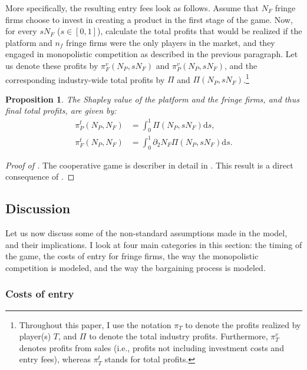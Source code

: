 \documentclass[a4paper]{article}
\newtheorem{proposition}{Proposition}
\newcommand{\ds}{\mathrm{d}s}
\begin{document}
More specifically, the resulting entry fees look as follows.
Assume that $N_F$ fringe firms choose to invest in creating a product in the first stage of the game.
Now, for every $s N_F$ ($s \in [0, 1]$), calculate the total profits that would be realized if the platform and $n_f$ fringe firms were the only players in the market, and they engaged in monopolistic competition as described in the previous paragraph.
Let us denote these profits by $\pi^v_{F}(N_P,s N_F)$ and $\pi^v_{P}(N_P,s N_F)$, and the corresponding industry-wide total profits by $\Pi$ and $\Pi(N_P,s N_F)$.\footnote{
    Throughout this paper, I use the notation $\pi_T$ to denote the profits realized by player(s) $T$, and $\Pi$ to denote the total industry profits.
    Furthermore, $\pi^v_T$ denotes profits from sales (i.e., profits not including investment costs and entry fees), whereas $\pi^t_T$ stands for total profits.
}

\begin{proposition}
    \label{prop:shapley_value}
    The Shapley value of the platform and the fringe firms, and thus final total profits, are given by:
    \begin{align*}
        \pi^t_P(N_P, N_F) &= \int_0^1 \Pi(N_P,s N_F) \ds, \\
        \pi^t_F(N_P, N_F) &= \int_0^1 \partial_2 N_F \Pi(N_P,s N_F) \ds.
    \end{align*}
\end{proposition}
\begin{proof}[Proof of ]
    The cooperative game is describer in detail in .
    This result is a direct consequence of .
\end{proof}

\subsection{Discussion}
\label{sec:model_discussion}

Let us now discuss some of the non-standard assumptions made in the model, and their implications.
I look at four main categories in this section: the timing of the game, the costs of entry for fringe firms, the way the monopolistic competition is modeled, and the way the bargaining process is modeled.

\subsubsection{Costs of entry}
\end{document}
